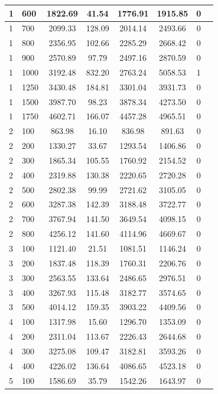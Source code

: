 \documentclass[czech, ing, kiv, he, iso690]{fasthesis}
\begin{document}
\begin{center}
\begin{longtable}{l l | c c c c c c}
1 & 600 & 1822.69 & 41.54 & 1776.91 & 1915.85 & 0 \\ \hline
1 & 700 & 2099.33 & 128.09 & 2014.14 & 2493.66 & 0 \\ \hline
1 & 800 & 2356.95 & 102.66 & 2285.29 & 2668.42 & 0 \\ \hline
1 & 900 & 2570.89 & 97.79 & 2497.16 & 2870.59 & 0 \\ \hline
1 & 1000 & 3192.48 & 832.20 & 2763.24 & 5058.53 & 1 \\ \hline
1 & 1250 & 3430.48 & 184.81 & 3301.04 & 3931.73 & 0 \\ \hline
1 & 1500 & 3987.70 & 98.23 & 3878.34 & 4273.50 & 0 \\ \hline
1 & 1750 & 4602.71 & 166.07 & 4457.28 & 4965.51 & 0 \\ \hline
2 & 100 & 863.98 & 16.10 & 836.98 & 891.63 & 0 \\ \hline
2 & 200 & 1330.27 & 33.67 & 1293.54 & 1406.86 & 0 \\ \hline
2 & 300 & 1865.34 & 105.55 & 1760.92 & 2154.52 & 0 \\ \hline
2 & 400 & 2319.88 & 130.38 & 2220.65 & 2720.28 & 0 \\ \hline
2 & 500 & 2802.38 & 99.99 & 2721.62 & 3105.05 & 0 \\ \hline
2 & 600 & 3287.38 & 142.39 & 3188.48 & 3722.77 & 0 \\ \hline
2 & 700 & 3767.94 & 141.50 & 3649.54 & 4098.15 & 0 \\ \hline
2 & 800 & 4256.12 & 141.60 & 4114.96 & 4669.67 & 0 \\ \hline
3 & 100 & 1121.40 & 21.51 & 1081.51 & 1146.24 & 0 \\ \hline
3 & 200 & 1837.48 & 118.39 & 1760.31 & 2206.76 & 0 \\ \hline
3 & 300 & 2563.55 & 133.64 & 2486.65 & 2976.51 & 0 \\ \hline
3 & 400 & 3267.93 & 115.48 & 3182.77 & 3574.65 & 0 \\ \hline
3 & 500 & 4014.12 & 159.35 & 3903.22 & 4409.56 & 0 \\ \hline
4 & 100 & 1317.98 & 15.60 & 1296.70 & 1353.09 & 0 \\ \hline
4 & 200 & 2311.04 & 113.67 & 2226.43 & 2644.68 & 0 \\ \hline
4 & 300 & 3275.08 & 109.47 & 3182.81 & 3593.26 & 0 \\ \hline
4 & 400 & 4226.02 & 136.64 & 4086.65 & 4523.18 & 0 \\ \hline
5 & 100 & 1586.69 & 35.79 & 1542.26 & 1643.97 & 0 \\ \hline

\end{longtable}
\end{center}
\end{document}
